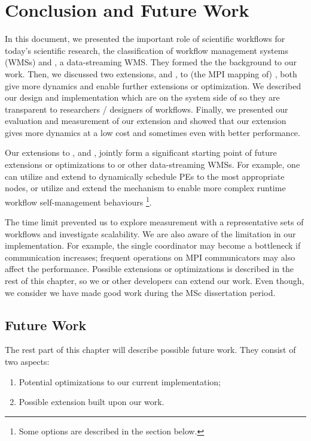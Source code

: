 \chapter{Conclusion and Future Work}
In this document, we presented the important role of scientific workflows for today's scientific research, the classification of workflow management systems (WMSs) and \dpy, a data-streaming WMS. They formed the the background to our work. Then, we discussed two extensions, \tincdep and \tdynexp, to (the MPI mapping of) \dpy, both give \dpy more dynamics and enable further extensions or optimization. We described our design and implementation which are on the system side of \dpy so they are transparent to researchers / designers of workflows. Finally, we presented our evaluation and measurement of our extension and showed that our extension gives \dpy more dynamics at a low cost and sometimes even with better performance.

Our extensions to \dpy, \tincdep and \tdynexp, jointly form a significant starting point of future extensions or optimizations to \dpy or other data-streaming WMSs. For example, one can utilize and extend \tincdep to dynamically schedule PEs to the most appropriate nodes, or utilize and extend the \tdynexp mechanism to enable more complex runtime workflow self-management behaviours \footnote{Some options are described in the  section below.}.

The time limit prevented us to explore measurement with a representative sets of workflows and investigate scalability. We are also aware of the limitation in our implementation. For example, the single coordinator may become a bottleneck if communication increases; frequent operations on MPI communicators may also affect the performance. Possible extensions or optimizations is described in the rest of this chapter, so we or other developers can extend our work. Even though, we consider we have made good work during the MSc dissertation period.

\section{Future Work}
The rest part of this chapter will describe possible future work. They consist of two aspects:
\begin{enumerate}
	\item Potential optimizations to our current implementation;
	\item Possible extension built upon our work.
\end{enumerate}

